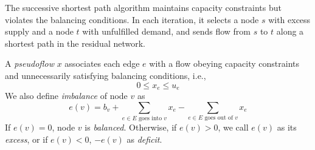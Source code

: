 \documentclass[UTF8,a4paper]{ctexart}
\begin{document}
The successive shortest path algorithm maintains capacity constraints but violates the balancing conditions.
In each iteration, it selects a node $s$ with excess supply and a node $t$ with unfulfilled demand,
and sends flow from $s$ to $t$ along a shortest path in the residual network.

\begin{definition}[pseudoflow]
    A \emph{pseudoflow} $x$ associates each edge $e$ with a flow
    obeying capacity constraints and unnecessarily satisfying balancing conditions,
    i.e.,
    \[
        0\leq x_e \leq u_e
    \]
    We also define \emph{imbalance} of node $v$ as
    \[
        e(v)=b_v + \sum_{e\in E\text{ goes into }v} x_e - \sum_{e\in E\text{ goes out of }v} x_e
    \]
    If $e(v)=0$, node $v$ is \emph{balanced}.
    Otherwise, if $e(v)>0$, we call $e(v)$ as its \emph{excess},
    or if $e(v)<0$, $-e(v)$ as \emph{deficit}.
\end{definition}
\end{document}
